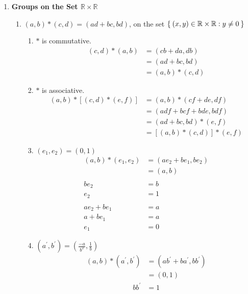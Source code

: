 \begin{enumerate}[label={\Alph*.},font={\bfseries}]
\begin{enumerate}[label={\arabic*},font={\bfseries}]
    \end{enumerate}
  \item {\bf Groups on the Set $\mathbb{R} \times \mathbb{R}$}
    \begin{enumerate}[label={\arabic*},font={\bfseries}]
    \item $(a,b) * (c,d) = (ad + bc, bd)$, on the set $\Set{(x,y)\in\mathbb{R}\times\mathbb{R} : y \ne 0}$
      \begin{enumerate}[label={(\roman*)}]
      \item $*$ is commutative.
        \begin{align*}
          (c,d) * (a,b) &= (cb+da,db) \\
          &= (ad+bc,bd) \\
          &= (a,b) * (c,d)
        \end{align*}
      \item $*$ is associative.
        \begin{align*}
          (a,b) * \left[(c,d) * (e,f)\right] &= (a,b) * (cf+de,df) \\
          &= (adf+bcf+bde,bdf) \\
          &= (ad+bc, bd) * (e,f) \\
          &= \left[(a,b) * (c,d)\right] * (e,f)
        \end{align*}
      \item $(e_1,e_2) = (0,1)$
        \begin{align*}
          (a,b) * (e_1,e_2) &= (ae_2 + be_1, be_2) \\
          &= (a,b) \\
          \\
          be_2 &= b \\
          e_2 &= 1 \\
          \\
          ae_2 + be_1 &= a \\
          a + be_1 &= a \\
          e_1 &= 0
        \end{align*}
      \item $(a^\prime,b^\prime) = \left(\frac{-a}{b^2}, \frac{1}{b}\right)$
        \begin{align*}
          (a,b) * (a^\prime,b^\prime) &= (ab^\prime + ba^\prime, bb^\prime) \\
          &= (0,1)
        \end{align*}
        \begin{align*}
          bb^\prime &= 1 \\

\end{align*}
\end{enumerate}
\end{enumerate}
\end{enumerate}
